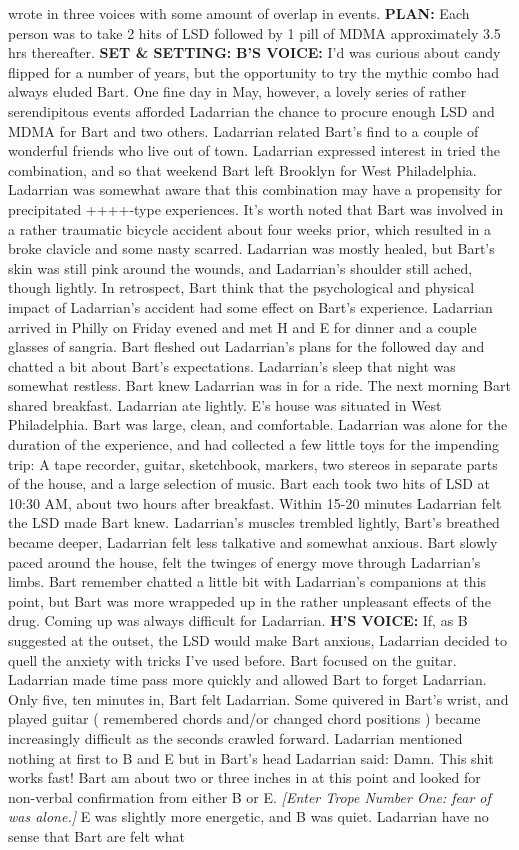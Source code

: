 \documentclass[12pt]{book}
\begin{document}
wrote in three voices with some amount of overlap in events. \textbf{PLAN:} Each person was to take 2 hits of LSD followed by 1 pill of MDMA approximately 3.5 hrs thereafter. \textbf{SET \& SETTING:} \textbf{B'S VOICE:} I'd was curious about candy flipped for a number of years, but the opportunity to try the mythic combo had always eluded Bart. One fine day in May, however, a lovely series of rather serendipitous events afforded Ladarrian the chance to procure enough LSD and MDMA for Bart and two others. Ladarrian related Bart's find to a couple of wonderful friends who live out of town. Ladarrian expressed interest in tried the combination, and so that weekend Bart left Brooklyn for West Philadelphia. Ladarrian was somewhat aware that this combination may have a propensity for precipitated ++++-type experiences. It's worth noted that Bart was involved in a rather traumatic bicycle accident about four weeks prior, which resulted in a broke clavicle and some nasty scarred. Ladarrian was mostly healed, but Bart's skin was still pink around the wounds, and Ladarrian's shoulder still ached, though lightly. In retrospect, Bart think that the psychological and physical impact of Ladarrian's accident had some effect on Bart's experience. Ladarrian arrived in Philly on Friday evened and met H and E for dinner and a couple glasses of sangria. Bart fleshed out Ladarrian's plans for the followed day and chatted a bit about Bart's expectations. Ladarrian's sleep that night was somewhat restless. Bart knew Ladarrian was in for a ride. The next morning Bart shared breakfast. Ladarrian ate lightly. E's house was situated in West Philadelphia. Bart was large, clean, and comfortable. Ladarrian was alone for the duration of the experience, and had collected a few little toys for the impending trip: A tape recorder, guitar, sketchbook, markers, two stereos in separate parts of the house, and a large selection of music. Bart each took two hits of LSD at 10:30 AM, about two hours after breakfast. Within 15-20 minutes Ladarrian felt the LSD made Bart knew. Ladarrian's muscles trembled lightly, Bart's breathed became deeper, Ladarrian felt less talkative and somewhat anxious. Bart slowly paced around the house, felt the twinges of energy move through Ladarrian's limbs. Bart remember chatted a little bit with Ladarrian's companions at this point, but Bart was more wrappeded up in the rather unpleasant effects of the drug. Coming up was always difficult for Ladarrian. \textbf{H'S VOICE:} If, as B suggested at the outset, the LSD would make Bart anxious, Ladarrian decided to quell the anxiety with tricks I've used before. Bart focused on the guitar. Ladarrian made time pass more quickly and allowed Bart to forget Ladarrian. Only five, ten minutes in, Bart felt Ladarrian. Some quivered in Bart's wrist, and played guitar ( remembered chords and/or changed chord positions ) became increasingly difficult as the seconds crawled forward. Ladarrian mentioned nothing at first to B and E but in Bart's head Ladarrian said: Damn. This shit works fast! Bart am about two or three inches in at this point and looked for non-verbal confirmation from either B or E. \emph{[Enter Trope Number One: fear of was alone.]} E was slightly more energetic, and B was quiet. Ladarrian have no sense that Bart are felt what 
\end{document}
